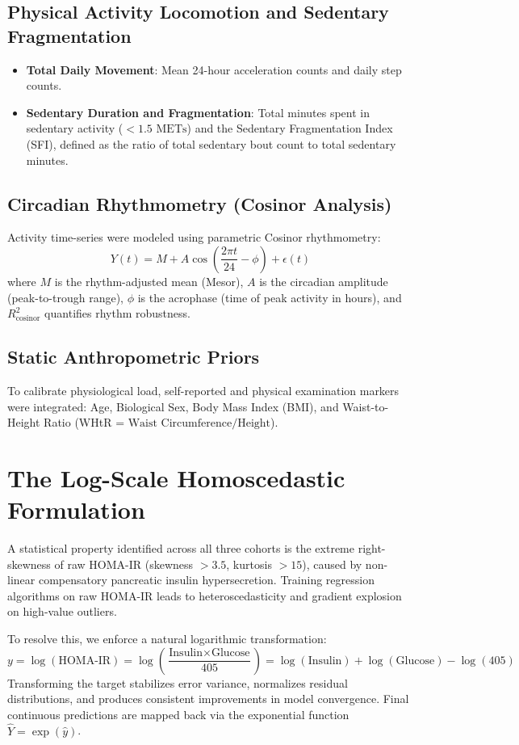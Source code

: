 \documentclass[12pt,a4paper,oneside]{report}
\begin{document}
\subsection{Physical Activity Locomotion and Sedentary Fragmentation}
\begin{itemize}
    \item \textbf{Total Daily Movement}: Mean 24-hour acceleration counts and daily step counts.
    \item \textbf{Sedentary Duration and Fragmentation}: Total minutes spent in sedentary activity ($< 1.5\text{ METs}$) and the Sedentary Fragmentation Index (SFI), defined as the ratio of total sedentary bout count to total sedentary minutes.
\end{itemize}

\subsection{Circadian Rhythmometry (Cosinor Analysis)}
Activity time-series were modeled using parametric Cosinor rhythmometry:
\begin{equation}
Y(t) = M + A \cos\left( \frac{2\pi t}{24} - \phi \right) + \epsilon(t)
\end{equation}
where $M$ is the rhythm-adjusted mean (Mesor), $A$ is the circadian amplitude (peak-to-trough range), $\phi$ is the acrophase (time of peak activity in hours), and $R^2_{\text{cosinor}}$ quantifies rhythm robustness.

\subsection{Static Anthropometric Priors}
To calibrate physiological load, self-reported and physical examination markers were integrated: Age, Biological Sex, Body Mass Index (BMI), and Waist-to-Height Ratio (WHtR = $\text{Waist Circumference} / \text{Height}$).

\section{The Log-Scale Homoscedastic Formulation}
A statistical property identified across all three cohorts is the extreme right-skewness of raw HOMA-IR (skewness $> 3.5$, kurtosis $> 15$), caused by non-linear compensatory pancreatic insulin hypersecretion. Training regression algorithms on raw HOMA-IR leads to heteroscedasticity and gradient explosion on high-value outliers.

To resolve this, we enforce a natural logarithmic transformation:
\begin{equation}
y = \log(\text{HOMA-IR}) = \log\left( \frac{\text{Insulin} \times \text{Glucose}}{405} \right) = \log(\text{Insulin}) + \log(\text{Glucose}) - \log(405)
\end{equation}
Transforming the target stabilizes error variance, normalizes residual distributions, and produces consistent improvements in model convergence. Final continuous predictions are mapped back via the exponential function $\hat{Y} = \exp(\hat{y})$.
\end{document}
